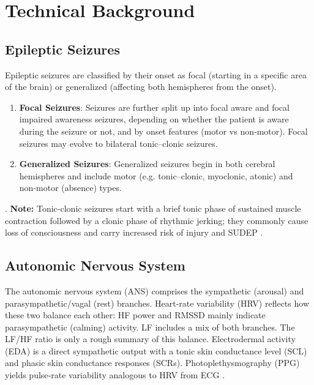 \section{Technical Background}

\subsection{Epileptic Seizures}
Epileptic seizures are classified by their onset as focal (starting in a specific area of the brain)
or generalized (affecting both hemispheres from the onset).
\begin{enumerate}
    \item \textbf{Focal Seizures}: Seizures are further split up into focal aware and focal impaired awareness seizures,
    depending on whether the patient is aware during the seizure or not, and by onset features (motor vs non‑motor).
    Focal seizures may evolve to bilateral tonic–clonic seizures.
    \item \textbf{Generalized Seizures}: Generalized seizures begin in both cerebral hemispheres and include motor
     (e.g. tonic–clonic, myoclonic, atonic) and non‑motor (absence) types.
\end{enumerate}
\parencite{fisherInstructionManualILAE2017}.
\textbf{Note:} Tonic‑clonic seizures start with a brief tonic phase of sustained muscle contraction followed
by a clonic phase of rhythmic jerking; they commonly cause loss of consciousness and carry increased risk of injury and SUDEP \parencite{hesdorfferCombinedAnalysisRisk2011}.

\subsection{Autonomic Nervous System}
The autonomic nervous system (ANS) comprises the sympathetic (arousal)
and parasympathetic/vagal (rest) branches. Heart‑rate variability (HRV)
reflects how these two balance each other: HF power and RMSSD mainly
indicate parasympathetic (calming) activity. LF includes a mix of both
branches. The LF/HF ratio is only a rough summary of this balance.
Electrodermal activity (EDA) is a direct sympathetic output with a tonic
skin conductance level (SCL) and phasic skin conductance responses (SCRs).
Photoplethysmography (PPG) yields pulse‑rate variability analogous to HRV
from ECG \parencite{mironAutonomicBiosignalsSeizure2025,masonHeartRateVariability2024}.

